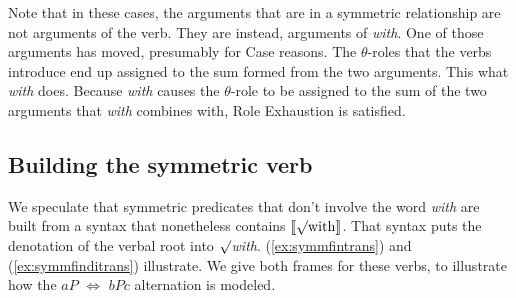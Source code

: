 \documentclass[twoside, 12pt]{article}
\newcommand{\denotes}[2][]{\ensuremath{\llbracket \text{#2}\rrbracket^{#1}}}
\begin{document}
Note that in these cases, the arguments that are in a symmetric relationship are not arguments of the verb. They are instead, arguments of \textit{with}. One of those arguments has moved, presumably for Case reasons. The $\theta$-roles that the verbs introduce end up assigned to the sum formed from the two arguments. This what \textit{with} does. Because \textit{with} causes the $\theta$-role to be assigned to the sum of the two arguments that \textit{with} combines with, Role Exhaustion is satisfied.

\subsection{Building the symmetric verb}

We speculate that symmetric predicates that don't involve the word \textit{with} are built from a syntax that nonetheless contains \denotes{$\surd$with}. That syntax puts the denotation of the verbal root into \textit{$\surd$with}.  (\ref{ex:symmfintrans}) and (\ref{ex:symmfinditrans}) illustrate. We give both frames for these verbs, to illustrate how the $aP$ $\Leftrightarrow$ $bPc$ alternation is modeled.
\end{document}
